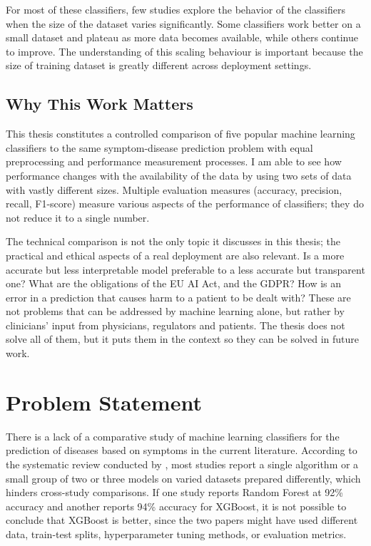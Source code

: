 For most of these classifiers, few studies explore the behavior of the classifiers when the size of the dataset varies significantly. Some classifiers work better on a small dataset and plateau as more data becomes available, while others continue to improve. The understanding of this scaling behaviour is important because the size of training dataset is greatly different across deployment settings.

\subsection{Why This Work Matters}

This thesis constitutes a controlled comparison of five popular machine learning classifiers to the same symptom-disease prediction problem with equal preprocessing and performance measurement processes. I am able to see how performance changes with the availability of the data by using two sets of data with vastly different sizes. Multiple evaluation measures (accuracy, precision, recall, F1-score) measure various aspects of the performance of classifiers; they do not reduce it to a single number.

The technical comparison is not the only topic it discusses in this thesis; the practical and ethical aspects of a real deployment are also relevant. Is a more accurate but less interpretable model preferable to a less accurate but transparent one? What are the obligations of the EU AI Act, and the GDPR? How is an error in a prediction that causes harm to a patient to be dealt with? These are not problems that can be addressed by machine learning alone, but rather by clinicians' input from physicians, regulators and patients. The thesis does not solve all of them, but it puts them in the context so they can be solved in future work.

\section{Problem Statement}
\label{sec:problem_statement}

There is a lack of a comparative study of machine learning classifiers for the prediction of diseases based on symptoms in the current literature. According to the systematic review conducted by \citet{Chowdhury2024}, most studies report a single algorithm or a small group of two or three models on varied datasets prepared differently, which hinders cross-study comparisons. If one study reports Random Forest at 92\% accuracy and another reports 94\% accuracy for XGBoost, it is not possible to conclude that XGBoost is better, since the two papers might have used different data, train-test splits, hyperparameter tuning methods, or evaluation metrics.

